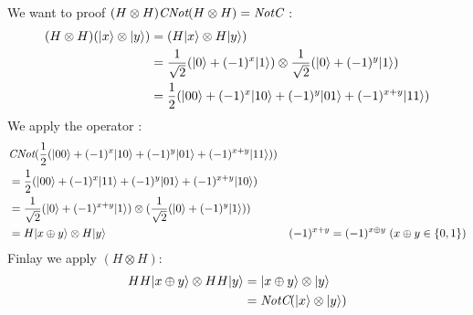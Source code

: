 We want to proof $(H \otimes H) \textit{CNot} (H \otimes H) = \textit{NotC}$ :
\begin{align*}
  (H \otimes H) (| x \rangle \otimes | y \rangle) &= (H | x \rangle \otimes H | y \rangle) \\
  &= \frac 1 {\sqrt 2}(| 0 \rangle + (-1)^x | 1 \rangle) \otimes
     \frac 1 {\sqrt 2}(| 0 \rangle + (-1)^y | 1 \rangle) \\
  &= \frac 1 2 (| 00 \rangle + (-1)^x | 10 \rangle + (-1)^y| 01 \rangle + (-1)^{x+y}| 11 \rangle)
\end{align*}
We apply the operator \CNot :
\begin{align*}
  &\textit{CNot} (\frac 1 2 (| 00 \rangle + (-1)^x | 10 \rangle + (-1)^y| 01 \rangle +
  (-1)^{x+y}| 11 \rangle)) \\
  &=\frac 1 2 (| 00 \rangle + (-1)^x | 11 \rangle + (-1)^y| 01 \rangle + (-1)^{x+y}| 10 \rangle)
  \\
  &= \frac 1{\sqrt 2}(| 0 \rangle + (-1)^{x+y}| 1 \rangle)\otimes (\frac 1{\sqrt 2}(| 0 \rangle +
  (-1)^y| 1 \rangle)) \\
  &= H| x \oplus y \rangle \otimes H| y \rangle & (-1)^{x+y} = (-1)^{x\oplus y}\; (x
  \oplus y \in \{0, 1\})
\end{align*}
Finlay we apply $(H \otimes H)$:
\begin{align*}
  HH| x\oplus y \rangle \otimes HH| y \rangle &= | x\oplus y \rangle \otimes | y \rangle\\
  &= \textit{NotC}(| x \rangle \otimes | y \rangle)
\end{align*}


